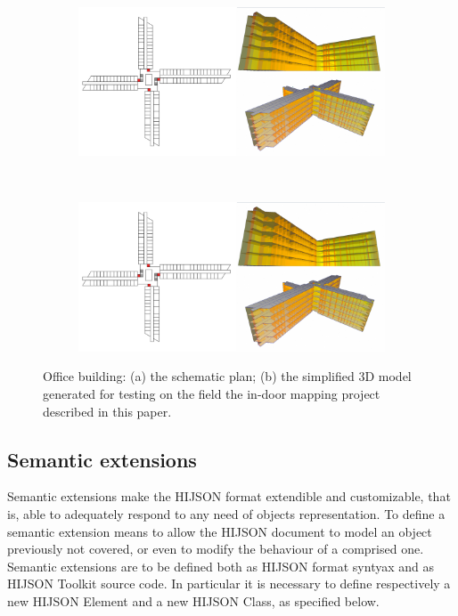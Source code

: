 \begin{figure}[!h]
 \centering
 \begin{subfigure}[b]{0.48\linewidth}
 \includegraphics[width=\textwidth]{images/sogei-a} 
 \caption{}
 \label{fig:sogei-a}
 \end{subfigure}
 ~
 \begin{subfigure}[b]{0.48\linewidth}
 \includegraphics[width=\textwidth]{images/sogei-b}
 \caption{}
 \label{fig:sogei-b}
 \end{subfigure}
 
 \caption{Office building: 
 (a) the schematic plan; 
 (b) the simplified 3D model generated for testing on the field 
 the in-door mapping project described in this paper.
 }
 \label{fig:sogei}
\end{figure}

\subsection{Semantic extensions}\label{semantic-extensions}

Semantic extensions make the HIJSON format extendible and customizable, that
is, able to adequately respond to any need of objects representation. To define a
semantic extension means to allow the HIJSON document to model an object
previously not covered, or even to modify the behaviour of a comprised one.
Semantic extensions are to be defined both as HIJSON format syntyax and as
HIJSON Toolkit source code. In particular it is necessary to define respectively
a new HIJSON Element and a new HIJSON Class, as specified below.

